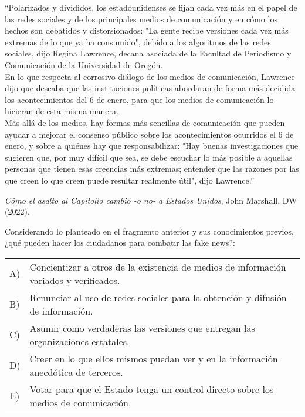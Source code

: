 \documentclass[letterpaper,11pt]{article}
\newcommand{\anchopregunta}{0.9\textwidth}
\begin{document}
\begin{enumerate}
\begin{minipage}{\anchopregunta}
\item ``Polarizados y divididos, los estadounidenses se fijan cada vez más en el papel de las redes sociales y de los principales medios de comunicación y en cómo los hechos son debatidos y distorsionados: "La gente recibe versiones cada vez más extremas de lo que ya ha consumido", debido a los algoritmos de las redes sociales, dijo Regina Lawrence, decana asociada de la Facultad de Periodismo y Comunicación de la Universidad de Oregón.\\En lo que respecta al corrosivo diálogo de los medios de comunicación, Lawrence dijo que deseaba que las instituciones políticas abordaran de forma más decidida los acontecimientos del 6 de enero, para que los medios de comunicación lo hicieran de esta misma manera.\\Más allá de los medios, hay formas más sencillas de comunicación que pueden ayudar a mejorar el consenso público sobre los acontecimientos ocurridos el 6 de enero, y sobre a quiénes hay que responsabilizar: "Hay buenas investigaciones que sugieren que, por muy difícil que sea, se debe escuchar lo más posible a aquellas personas que tienen esas creencias más extremas; entender que las razones por las que creen lo que creen puede resultar realmente útil", dijo Lawrence.''
\begin{flushright}
\textit{Cómo el asalto al Capitolio cambió -o no- a Estados Unidos}, John Marshall, DW (2022). 
\end{flushright}
Considerando lo planteado en el fragmento anterior y sus conocimientos previos, ¿qué pueden hacer los ciudadanos para combatir las fake news?:
\begin{flushleft}\begin{tabular}{@{\hspace{-.001\textwidth}}l@{\hspace{2pt}}p{}}
A)& Concientizar a otros de la existencia de medios de información variados y verificados.\\
B)& Renunciar al uso de redes sociales para la obtención y difusión de información.\\
C)& Asumir como verdaderas las versiones que entregan las organizaciones estatales.\\
D)& Creer en lo que ellos mismos puedan ver y en la información anecdótica de terceros.\\
E)& Votar para que el Estado tenga un control directo sobre los medios de comunicación.\\ 

\end{tabular}
\end{flushleft}
\end{minipage}
\end{enumerate}
\end{document}
